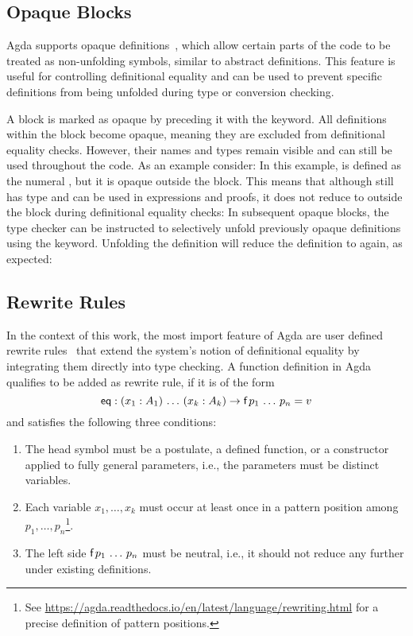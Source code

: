 \documentclass[screen,nonacm]{acmart}
\begin{document}
\subsection*{Opaque Blocks}

Agda supports opaque definitions~\cite{gratzer2022controlling}, which allow
certain parts of the code to be treated as non-unfolding symbols, similar to
abstract definitions. This feature is useful for controlling definitional
equality and can be used to prevent specific definitions from being unfolded
during type or conversion checking.

A block is marked as opaque by preceding it with the 
keyword. All definitions within the block become opaque, meaning they are
excluded from definitional equality checks. However, their names and types
remain visible and can still be used throughout the code. As an example
consider: \EOpaque{}In this example,  is defined as the
numeral , but it is opaque outside the block. This means that
although  still has type  and can be
used in expressions and proofs, it does not reduce to  outside
the block during definitional equality checks: \EOpaqueExO{}In subsequent
opaque blocks, the type checker can be instructed to selectively unfold
previously opaque definitions using the  keyword.
Unfolding the definition will reduce the definition to  again,
as expected: \EOpaqueExT{}

\subsection*{Rewrite Rules}

In the context of this work, the most import feature of Agda are user defined
rewrite rules~\cite{10.1145/3434341, cockx:LIPIcs.TYPES.2019.2} that extend the
system’s notion of definitional equality by integrating them directly into type
checking. A function definition in Agda qualifies to be added as rewrite rule,
if it is of the form
\[
      \AgdaFunction{eq} : (x_1 : A_1)\, \ldots\, (x_k : A_k) \to \AgdaFunction{f}\, p_1\, \ldots\, p_n = v
\]
and satisfies the following three conditions:
\begin{enumerate}
      \item The head symbol  must be a postulate, a defined function, or a
            constructor applied to fully general parameters, i.e., the parameters must be
            distinct variables.
      \item Each variable $x_1, \ldots, x_k$ must occur at least once in a pattern position
            among $p_1, \ldots, p_n$\footnote{See
                  \url{https://agda.readthedocs.io/en/latest/language/rewriting.html} for a
                  precise definition of pattern positions.}.
      \item The left side $\AgdaFunction{f}\, p_1\, \ldots\, p_n$ must be neutral, i.e., it
            should not reduce any further under existing definitions.
\end{enumerate}
\end{document}
